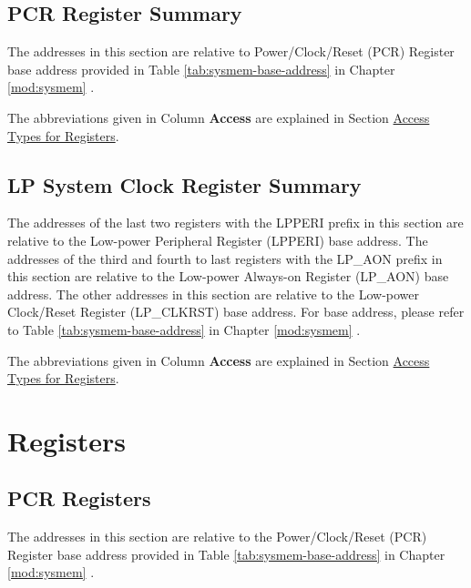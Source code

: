 \documentclass[main\_\_EN.tex]{subfiles}
\begin{document}
\subsection{PCR Register Summary}

The addresses in this section are relative to Power/Clock/Reset (PCR) Register base address provided in Table \ref{tab:sysmem-base-address} in Chapter \ref{mod:sysmem} \textit{}.

The abbreviations given in Column \textbf{Access} are explained in Section \hyperref[glossary-access-types]{Access Types for Registers}.



\subsection{LP System Clock Register Summary}

The addresses of the last two registers with the LPPERI prefix in this section are relative to the Low-power Peripheral Register (LPPERI) base address. The addresses of the third and fourth to last registers with the LP\_AON prefix in this section are relative to the Low-power Always-on Register (LP\_AON) base address. The other addresses in this section are relative to the Low-power Clock/Reset Register (LP\_CLKRST) base address. For base address, please refer to Table \ref{tab:sysmem-base-address} in Chapter \ref{mod:sysmem} \textit{}.

The abbreviations given in Column \textbf{Access} are explained in Section \hyperref[glossary-access-types]{Access Types for Registers}.






\clearpage
\section{Registers}

\subsection{PCR Registers}


The addresses in this section are relative to the Power/Clock/Reset (PCR) Register base address provided in Table  \ref{tab:sysmem-base-address} in Chapter  \ref{mod:sysmem} \textit{}.
\end{document}
